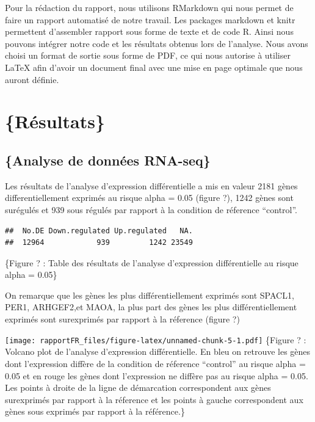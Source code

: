\documentclass[
  12pt,
]{article}
\begin{document}
Pour la rédaction du rapport, nous utilisons RMarkdown qui nous permet
de faire un rapport automatisé de notre travail. Les packages markdown
et knitr permettent d'assembler rapport sous forme de texte et de code
R. Ainsi nous pouvons intégrer notre code et les résultats obtenus lors
de l'analyse. Nous avons choisi un format de sortie sous forme de PDF,
ce qui nous autorise à utiliser LaTeX afin d'avoir un document final
avec une mise en page optimale que nous auront définie.

\newpage

\hypertarget{ruxe9sultats}{%
\section{\texorpdfstring{\Large\{Résultats\}}{\{Résultats\}}}\label{ruxe9sultats}}

\hypertarget{analyse-de-donnuxe9es-rna-seq-1}{%
\subsection{\texorpdfstring{\large\{Analyse de données
RNA-seq\}}{\{Analyse de données RNA-seq\}}}\label{analyse-de-donnuxe9es-rna-seq-1}}

Les résultats de l'analyse d'expression différentielle a mis en valeur
2181 gènes differentiellement exprimés au risque alpha = 0.05 (figure
?), 1242 gènes sont surégulés et 939 sous régulés par rapport à la
condition de réference ``control''.

\singlespacing

\begin{verbatim}
##  No.DE Down.regulated Up.regulated   NA.
##  12964            939         1242 23549
\end{verbatim}

\sffamily\small\{Figure ? : Table des résultats de l'analyse
d'expression différentielle au risque alpha = 0.05\} \normalsize
{} 

\par

On remarque que les gènes les plus différentiellement exprimés sont
SPACL1, PER1, ARHGEF2,et MAOA, la plus part des gènes les plus
différentiellement exprimés sont surexprimés par rapport à la réference
(figure ?)

\singlespacing

\texttt{[image: rapportFR\_files/figure-latex/unnamed-chunk-5-1.pdf]}
\sffamily\small\{Figure ? : Volcano plot de l'analyse d'expression
différentielle. En bleu on retrouve les gènes dont l'expression diffère
de la condition de réference ``control'' au risque alpha = 0.05 et en
rouge les gènes dont l'expression ne diffère pas au risque alpha = 0.05.
Les points à droite de la ligne de démarcation correspondent aux gènes
surexprimés par rapport à la réference et les points à gauche
correspondent aux gènes sous exprimés par rapport à la référence.\}
\normalsize
\end{document}
